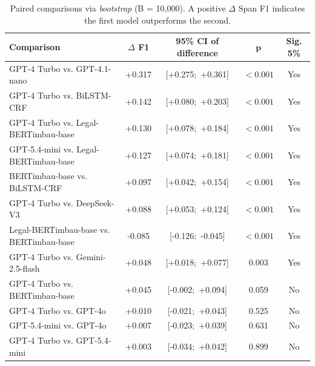 \begin{table}[ht]
    \centering
    \caption{Paired comparisons via \textit{bootstrap} (B = 10,000). A positive $\Delta$ Span F1 indicates the first model outperforms the second.}
    \label{tab:bootstrap_paired}
    \small
    \begin{tabular}{lcccc}
        \hline
        \textbf{Comparison} & $\Delta$ \textbf{F1} & \textbf{95\% CI of difference} & $\mathbf{p}$ & \textbf{Sig. 5\%} \\
        \hline
        GPT-4 Turbo vs. GPT-4.1-nano & +0.317 & [+0.275;\ +0.361] & $< 0.001$ & Yes \\
        GPT-4 Turbo vs. BiLSTM-CRF & +0.142 & [+0.080;\ +0.203] & $< 0.001$ & Yes \\
        GPT-4 Turbo vs. Legal-BERTimbau-base & +0.130 & [+0.078;\ +0.184] & $< 0.001$ & Yes \\
        GPT-5.4-mini vs. Legal-BERTimbau-base & +0.127 & [+0.074;\ +0.181] & $< 0.001$ & Yes \\
        BERTimbau-base vs. BiLSTM-CRF & +0.097 & [+0.042;\ +0.154] & $< 0.001$ & Yes \\
        GPT-4 Turbo vs. DeepSeek-V3 & +0.088 & [+0.053;\ +0.124] & $< 0.001$ & Yes \\
        Legal-BERTimbau-base vs. BERTimbau-base & -0.085 & [-0.126;\ -0.045] & $< 0.001$ & Yes \\
        GPT-4 Turbo vs. Gemini-2.5-flash & +0.048 & [+0.018;\ +0.077] & 0.003 & Yes \\
        GPT-4 Turbo vs. BERTimbau-base & +0.045 & [-0.002;\ +0.094] & 0.059 & No \\
        GPT-4 Turbo vs. GPT-4o & +0.010 & [-0.021;\ +0.043] & 0.525 & No \\
        GPT-5.4-mini vs. GPT-4o & +0.007 & [-0.023;\ +0.039] & 0.631 & No \\
        GPT-4 Turbo vs. GPT-5.4-mini & +0.003 & [-0.034;\ +0.042] & 0.899 & No \\
        \hline
    \end{tabular}
\end{table}
